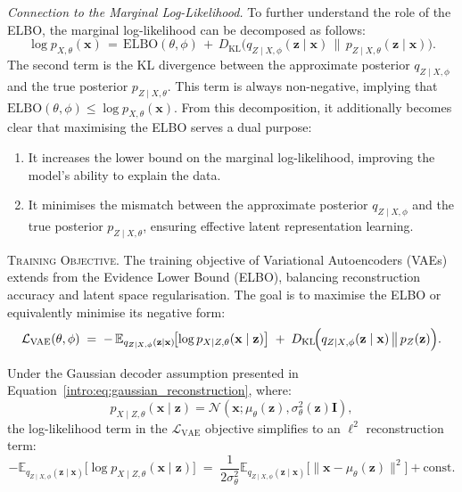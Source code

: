 \textit{Connection to the Marginal Log-Likelihood.} To further understand the role of the ELBO, the marginal log-likelihood can be decomposed as follows:
\[
\log p_{X,\theta}(\mathbf{x}) 
\,=\,
\mathrm{ELBO}(\theta, \phi)
\,+\,
D_{\mathrm{KL}}\big(q_{Z \mid X,\phi}(\mathbf{z} \mid \mathbf{x}) \,\|\, p_{Z \mid X,\theta}(\mathbf{z} \mid \mathbf{x})\big).
\]
The second term is the KL divergence between the approximate posterior \(q_{Z \mid X,\phi}\) and the true posterior \(p_{Z \mid X,\theta}\). This term is always non-negative, implying that \(\mathrm{ELBO}(\theta, \phi) \leq \log p_{X,\theta}(\mathbf{x})\). From this decomposition, it additionally becomes clear that maximising the ELBO serves a dual purpose:
\begin{enumerate}
    \item It increases the lower bound on the marginal log-likelihood, improving the model's ability to explain the data.
    \item It minimises the mismatch between the approximate posterior \(q_{Z \mid X,\phi}\) and the true posterior \(p_{Z \mid X,\theta}\), ensuring effective latent representation learning.
\end{enumerate}



\textsc{Training Objective.} The training objective of Variational Autoencoders (VAEs) extends from the Evidence Lower Bound (ELBO), balancing reconstruction accuracy and latent space regularisation. The goal is to maximise the ELBO or equivalently minimise its negative form:
\[
\mathcal{L}_{\text{VAE}}(\theta, \phi)
\;=\;
-\,\mathbb{E}_{q_{Z \mid X,\phi}(\mathbf{z}\mid \mathbf{x})}\!
\bigl[\log p_{X \mid Z, \theta}(\mathbf{x}\mid \mathbf{z})\bigr]
\;+\;
D_{\mathrm{KL}}\!\Bigl(
    q_{Z \mid X,\phi}(\mathbf{z}\mid \mathbf{x})
    \,\bigl\|\,
    p_{Z}(\mathbf{z})
\Bigr).
\]

\noindent Under the Gaussian decoder assumption presented in Equation~\ref{intro:eq:gaussian_reconstruction}, where:
\[
p_{X \mid Z, \theta}(\mathbf{x} \mid \mathbf{z}) = \mathcal{N}(\mathbf{x}; \mu_\theta(\mathbf{z}), \sigma_\theta^2(\mathbf{z}) \mathbf{I}),
\]
the log-likelihood term in the \(\mathcal{L}_{\text{VAE}}\) objective simplifies to an \(\ell^2\) reconstruction term:
\[
-\mathbb{E}_{q_{Z \mid X, \phi}(\mathbf{z} \mid \mathbf{x})}
\bigl[\log p_{X \mid Z, \theta}(\mathbf{x} \mid \mathbf{z})\bigr]
\;=\;
\frac{1}{2\sigma_\theta^2}\mathbb{E}_{q_{Z \mid X, \phi}(\mathbf{z} \mid \mathbf{x})}
\bigl[\|\mathbf{x} - \mu_\theta(\mathbf{z})\|^2\bigr]
+ \text{const}.
\]

